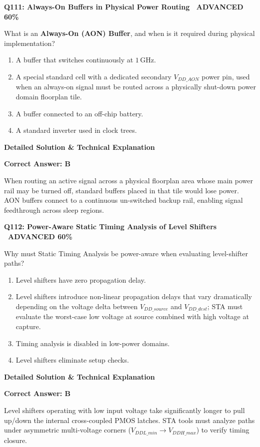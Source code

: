 \documentclass[11pt,a4paper]{article}
\newcommand{\badgeadv}{{\color{white}\colorbox{advred}{\bfseries\sffamily\tiny\ ADVANCED 60\%\ }}}
\newenvironment{qbox}[2]{%
  \begin{mdframed}[style=qstyle]%
  {\bfseries\sffamily\color{primaryblue}#1 \hfill #2}\par\vspace{2pt}%
}{%
  \end{mdframed}%
}
\newenvironment{ansbox}{%
  \begin{mdframed}[style=ansstyle]%
  {\bfseries\sffamily\color{ansgreen}\small Detailed Solution \& Technical Explanation}\par\vspace{2pt}\small%
}{%
  \end{mdframed}%
}
\begin{document}
\begin{qbox}{Q111: Always-On Buffers in Physical Power Routing}{\badgeadv}
What is an \textbf{Always-On (AON) Buffer}, and when is it required during physical implementation?
\begin{enumerate}[label=\textbf{\Alph*.}]
  \item A buffer that switches continuously at $1\,\text{GHz}$.
  \item A special standard cell with a dedicated secondary $V_{DD\_AON}$ power pin, used when an always-on signal must be routed across a physically shut-down power domain floorplan tile.
  \item A buffer connected to an off-chip battery.
  \item A standard inverter used in clock trees.
\end{enumerate}
\end{qbox}
\begin{ansbox}
\textbf{Correct Answer: B}

When routing an active signal across a physical floorplan area whose main power rail may be turned off, standard buffers placed in that tile would lose power. AON buffers connect to a continuous un-switched backup rail, enabling signal feedthrough across sleep regions.
\end{ansbox}

\begin{qbox}{Q112: Power-Aware Static Timing Analysis of Level Shifters}{\badgeadv}
Why must Static Timing Analysis be power-aware when evaluating level-shifter paths?
\begin{enumerate}[label=\textbf{\Alph*.}]
  \item Level shifters have zero propagation delay.
  \item Level shifters introduce non-linear propagation delays that vary dramatically depending on the voltage delta between $V_{DD\_source}$ and $V_{DD\_dest}$; STA must evaluate the worst-case low voltage at source combined with high voltage at capture.
  \item Timing analysis is disabled in low-power domains.
  \item Level shifters eliminate setup checks.
\end{enumerate}
\end{qbox}
\begin{ansbox}
\textbf{Correct Answer: B}

Level shifters operating with low input voltage take significantly longer to pull up/down the internal cross-coupled PMOS latches. STA tools must analyze paths under asymmetric multi-voltage corners ($V_{DDL\_min} \rightarrow V_{DDH\_max}$) to verify timing closure.
\end{ansbox}
\end{document}
